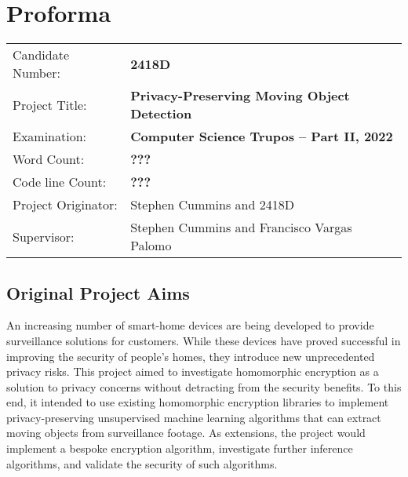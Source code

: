 \pagestyle{plain}

\chapter*{Proforma}

{\large
\begin{tabular}{ll}
Candidate Number:   & \bf 2418D                                      \\
Project Title:      & \bf Privacy-Preserving Moving Object Detection \\
Examination:        & \bf Computer Science Trupos -- Part II, 2022   \\
Word Count:         & \bf ???\footnotemark[1]                        \\
Code line Count:    & \bf ???                                        \\
Project Originator: & Stephen Cummins and 2418D                      \\
Supervisor:         & Stephen Cummins and Francisco Vargas Palomo    \\ 
\end{tabular}
}

\section*{Original Project Aims}
\setlength{\leftskip}{0.25cm}
\indent \indent
An increasing number of smart-home devices are being developed to provide surveillance solutions for customers. While these devices have proved successful in improving the security of people's homes, they introduce new unprecedented privacy risks. This project aimed to investigate homomorphic encryption as a solution to privacy concerns without detracting from the security benefits. To this end, it intended to use existing homomorphic encryption libraries to implement privacy-preserving unsupervised machine learning algorithms that can extract moving objects from surveillance footage. As extensions, the project would implement a bespoke encryption algorithm, investigate further inference algorithms, and validate the security of such algorithms.

\setlength{\leftskip}{0cm}





